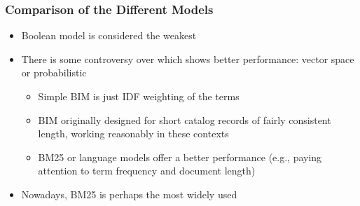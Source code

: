 \documentclass[svgnames]{beamer}
\begin{document}
\begin{frame}   \frametitle{Comparison of the Different Models}

  \begin{block}{}
    \begin{itemize}
    \item Boolean model is considered the weakest
    \item There is some controversy over which shows better performance: vector space or probabilistic
     \begin{itemize}
     \item Simple BIM is just IDF weighting of the terms
     \item BIM originally designed for short catalog records of fairly consistent length, working reasonably in these contexts
     \item BM25 or language models offer a better performance (e.g., paying attention to term frequency and document length)
     \end{itemize}
    \item Nowadays, BM25 is perhaps the most widely used
    \end{itemize}
  \end{block}
\end{frame}


\end{document}
